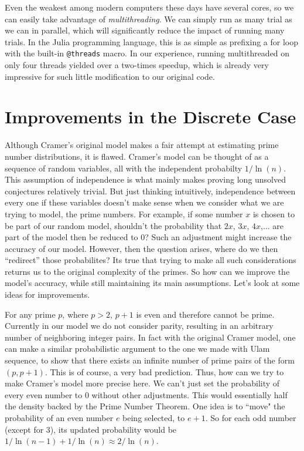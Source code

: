 \documentclass[conference]{IEEEtran}
\begin{document}
Even the weakest among modern computers these days have
several cores, so we can easily take advantage of
\textit{multithreading}. We can simply run as many trial
as we can in parallel, which will significantly reduce
the impact of running many trials. In the Julia
programming language, this is as simple as
prefixing a for loop with the built-in
\verb|@threads| macro. In our experience, running
multithreaded on only four threads yielded over a
two-times speedup, which is already very impressive
for such little modification to our original code.

\section{Improvements in the Discrete Case}

Although Cramer's original model makes a fair attempt at estimating prime number distributions, it is flawed. Cramer's model can be thought of as a sequence of random variables, all with the independent probabilty $1 / \ln(n)$. This assumption of independence is what mainly makes proving long unsolved conjectures relatively trivial. But just thinking intuitively, independence between every one if these variables doesn't make sense when we consider what we are trying to model, the prime numbers. For example, if some number $x$ is chosen to be part of our random model, shouldn't the probability that $2x$, $3x$, $4x$,$\dots$ are part of the model then be reduced to 0? Such an adjustment might increase the accuracy of our model. However, then the question arises, where do we then ``redirect'' those probabilites? Its true that trying to make all such considerations returns us to the original complexity of the primes. So how can we improve the model's accuracy, while still maintaining its main assumptions. Let's look at some ideas for improvements. 

For any prime $p$, where $p > 2$, $p + 1$ is even and therefore cannot be prime. Currently in our model we do not consider parity, resulting in an arbitrary number of neighboring integer pairs. In fact with the original Cramer model, one can make a similar probabilistic argument to the one we made with Ulam sequence, to show that there exists an infinite number of prime pairs of the form $(p, p + 1)$. This is of course, a very bad prediction. Thus, how can we try to make Cramer's model more precise here. We can't just set the probability of every even number to 0 without other adjustments. This would essentially half the density backed by the Prime Number Theorem. One idea is to ``move" the probability of an even number $e$ being selected, to $e + 1$. So for each odd number (except for 3), its updated probability would be $1 / \ln(n - 1) + 1 / \ln(n) \approx 2 / \ln(n)$.
\end{document}
